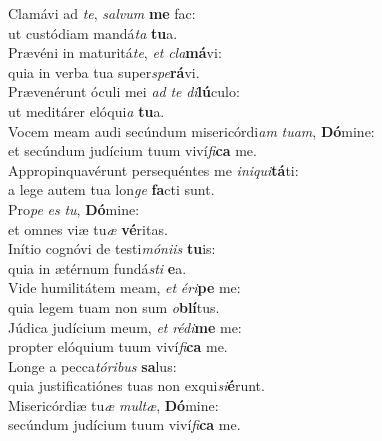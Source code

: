 \evenverse Clamávi ad \textit{te}, \textit{sal}\textit{vum} \textbf{me} fac:~\*\\
\evenverse ut custódiam mandá\textit{ta} \textbf{tu}a.\\
\oddverse Prævéni in maturitá\textit{te}, \textit{et} \textit{cla}\textbf{má}vi:~\*\\
\oddverse quia in verba tua super\textit{spe}\textbf{rá}vi.\\
\evenverse Prævenérunt óculi mei \textit{ad} \textit{te} \textit{di}\textbf{lú}culo:~\*\\
\evenverse ut meditárer elóqui\textit{a} \textbf{tu}a.\\
\oddverse Vocem meam audi secúndum misericórdi\textit{am} \textit{tu}\textit{am}, \textbf{Dó}mine:~\*\\
\oddverse et secúndum judícium tuum viví\textit{fi}\textbf{ca} me.\\
\evenverse Appropinquavérunt persequéntes me \textit{i}\textit{ni}\textit{qui}\textbf{tá}ti:~\*\\
\evenverse a lege autem tua lon\textit{ge} \textbf{fa}cti sunt.\\
\oddverse Pro\textit{pe} \textit{es} \textit{tu}, \textbf{Dó}mine:~\*\\
\oddverse et omnes viæ tu\textit{æ} \textbf{vé}ritas.\\
\evenverse Inítio cognóvi de testi\textit{mó}\textit{ni}\textit{is} \textbf{tu}is:~\*\\
\evenverse quia in ætérnum fundá\textit{sti} \textbf{e}a.\\
\oddverse Vide humilitátem meam, \textit{et} \textit{é}\textit{ri}\textbf{pe} me:~\*\\
\oddverse quia legem tuam non sum \textit{o}\textbf{blí}tus.\\
\evenverse Júdica judícium meum, \textit{et} \textit{ré}\textit{di}\textbf{me} me:~\*\\
\evenverse propter elóquium tuum viví\textit{fi}\textbf{ca} me.\\
\oddverse Longe a pecca\textit{tó}\textit{ri}\textit{bus} \textbf{sa}lus:~\*\\
\oddverse quia justificatiónes tuas non exqui\textit{si}\textbf{é}runt.\\
\evenverse Misericórdiæ tu\textit{æ} \textit{mul}\textit{tæ}, \textbf{Dó}mine:~\*\\
\evenverse secúndum judícium tuum viví\textit{fi}\textbf{ca} me.\\
